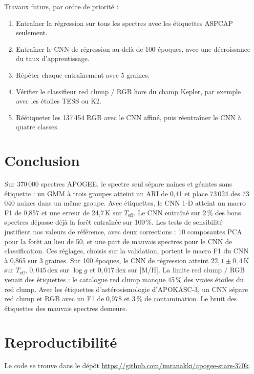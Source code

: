 \documentclass[11pt,a4paper]{article}
\newcommand{\teff}{$T_{\mathrm{eff}}$}
\newcommand{\mh}{[M/H]}
\begin{document}
Travaux futurs, par ordre de priorité :
\begin{enumerate}
  \item Entraîner la régression sur tous les spectres avec les étiquettes ASPCAP seulement.
  \item Entraîner le CNN de régression au-delà de 100 époques, avec une décroissance du taux d'apprentissage.
  \item Répéter chaque entraînement avec 5 graines.
  \item Vérifier le classifieur red clump / RGB hors du champ Kepler, par exemple avec les étoiles TESS ou K2.
  \item Réétiqueter les 137\,454 RGB avec le CNN affiné, puis réentraîner le CNN à quatre classes.
\end{enumerate}

\section{Conclusion}

Sur 370\,000 spectres APOGEE, le spectre seul sépare naines et géantes sans étiquette : un GMM à trois groupes atteint un ARI de 0,41 et place 73\,024 des 73\,040 naines dans un même groupe. Avec étiquettes, le CNN 1-D atteint un macro F1 de 0,857 et une erreur de 24,7\,K sur \teff{}. Le CNN entraîné sur 2\,\% des bons spectres dépasse déjà la forêt entraînée sur 100\,\%. Les tests de sensibilité justifient nos valeurs de référence, avec deux corrections : 10 composantes PCA pour la forêt au lieu de 50, et une part de mauvais spectres pour le CNN de classification. Ces réglages, choisis sur la validation, portent le macro F1 du CNN à 0,865 sur 3 graines. Sur 100 époques, le CNN de régression atteint $22{,}1 \pm 0{,}4$\,K sur \teff{}, $0{,}045$\,dex sur $\log g$ et $0{,}017$\,dex sur \mh{}. La limite red clump / RGB venait des étiquettes : le catalogue red clump manque 45\,\% des vraies étoiles du red clump. Avec les étiquettes d'astérosismologie d'APOKASC-3, un CNN sépare red clump et RGB avec un F1 de 0,978 et 3\,\% de contamination. Le bruit des étiquettes des mauvais spectres demeure.

\section*{Reproductibilité}

Le code se trouve dans le dépôt \url{https://github.com/imranakki/apogee-stars-370k}.
\end{document}
